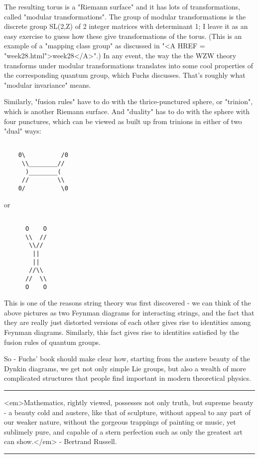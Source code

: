 The resulting torus is a "Riemann surface" and it has lots of
transformations, called "modular transformations".  The group of
modular transformations is the discrete group SL(2,Z) of 2 integer
matrices with determinant 1; I leave it as an easy exercise to guess
how these give transformations of the torus.  (This is an example of a
"mapping class group" as discussed in "<A HREF =
"week28.html">week28</A>".)  In any event, the way the the WZW theory
transforms under modular transformations translates into some cool
properties of the corresponding quantum group, which Fuchs discusses.
That's roughly what "modular invariance" means.

Similarly, "fusion rules" have to do with the thrice-punctured sphere,
or "trinion", which is another Riemann surface.  And "duality" has
to do with the sphere with four punctures, which can be viewed as
built up from trinions in either of two "dual" ways:


\begin{verbatim}

    0\          /0
     \\________//
      )________(
     //        \\
    0/          \0
\end{verbatim}
    

or


\begin{verbatim}

      O    O
      \\  //
       \\//
        ||                 
        ||
       //\\
      //  \\
      O    O
\end{verbatim}
    

This is one of the reasons string theory was first discovered -
we can think of the above pictures as two Feynman diagrams for
interacting strings, and the fact that they are really just distorted
versions of each other gives rise to identities among Feynman diagrams.
Similarly, this fact gives rise to identities satisfied by the fusion
rules of quantum groups.

So - Fuchs' book should make clear how, starting from the austere
beauty of the Dynkin diagrams, we get not only simple Lie groups, but
also a wealth of more complicated structures that people find important
in modern theoretical physics.  

\par\noindent\rule{\textwidth}{0.4pt}
<em>Mathematics, rightly viewed, possesses not only truth, but supreme 
beauty - a beauty cold and austere, like that of sculpture, without appeal 
to any part of our weaker nature, without the gorgeous trappings of painting 
or music, yet sublimely pure, and capable of a stern perfection such as 
only the greatest art can show.</em> - Bertrand Russell.

\par\noindent\rule{\textwidth}{0.4pt}


